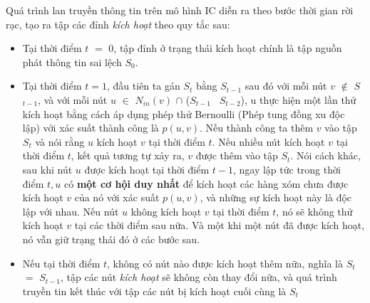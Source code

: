 	Quá trình lan truyền thông tin trên mô hình IC diễn ra theo bước thời gian rời rạc, tạo ra tập các đỉnh {\itshape kích hoạt} theo quy tắc sau:
	\begin {itemize}
		\item Tại thời điểm $t$ $=$ $0$, tập đỉnh ở trạng thái kích hoạt chính là tập nguồn phát thông tin sai lệch $S_{0}$.
	
		\item Tại thời điểm $t = 1$, đầu tiên ta gán $S$$_{t}$ bằng $S$$_{t-1}$ sau đó với mỗi nút $v$ $\notin$ $S$ $_{t-1}$, và với mỗi nút $u$ $\in$ $N$$_{in}$$(v)$ $\cap$ ($S$$_{t-1}$ \ $S$$_{t-2}$), u thực hiện một lần thử kích hoạt bằng cách áp dụng phép thử Bernoulli (Phép tung đồng xu độc lập) với xác suất thành công là $p(u,v)$. Nếu thành công ta thêm $v$ vào tập $S$$_{t}$ và nói rằng $u$ kích hoạt $v$ tại thời điểm $t$. Nếu nhiều nút kích hoạt $v$ tại thời điểm $t$, kết quả tương tự xảy ra, $v$ được thêm vào tập $S$$_{t}$. Nói cách khác, sau khi nút $u$ được kích hoạt tại thời điểm $t-1$, ngay lập tức trong thời điểm $t, u$ có {\bfseries một cơ hội duy nhất} để kích hoạt các hàng xóm chưa được kích hoạt $v$ của nó với xác suất $p(u,v)$, và những sự kích hoạt này là độc lập với nhau. Nếu nút $u$ không kích hoạt $v$ tại thời điểm $t$, nó sẽ không thử kích hoạt $v$ tại các thời điểm sau nữa. Và một khi một nút đã được kích hoạt, nó vẫn giữ trạng thái đó ở các bước sau.
		
		\item Nếu tại thời điểm $t$, không có nút nào được kích hoạt thêm nữa, nghĩa là $S$$_{t}$ $=$ $S$$_{t-1}$, tập các nút {\itshape kích hoạt} sẽ không còn thay đổi nữa, và quá trình truyền tin kết thúc với tập các nút bị kích hoạt cuối cùng là $S$$_{t}$
	\end {itemize}
	
